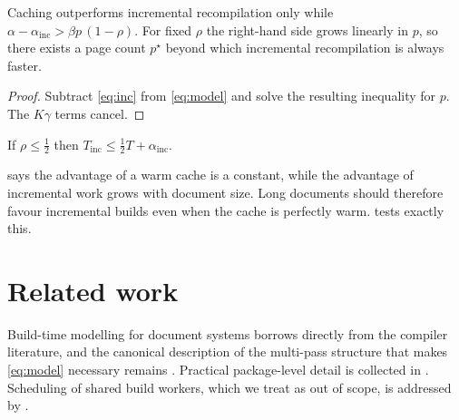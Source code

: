 \begin{theorem}[Crossover]
\label{thm:crossover}
Caching outperforms incremental recompilation only while
$\alpha - \alpha_{\mathrm{inc}} > \beta p\,(1-\rho)$. For fixed $\rho$
the right-hand side grows linearly in $p$, so there exists a page count
$p^{\star}$ beyond which incremental recompilation is always faster.
\end{theorem}

\begin{proof}
Subtract \cref{eq:inc} from \cref{eq:model} and solve the resulting
inequality for $p$. The $K\gamma$ terms cancel.
\end{proof}

\begin{lemma}
\label{lem:bound}
If $\rho \le \tfrac{1}{2}$ then $T_{\mathrm{inc}} \le \tfrac{1}{2}T + \alpha_{\mathrm{inc}}$.
\end{lemma}

\begin{keybox}
 says the advantage of a warm cache is a constant,
while the advantage of incremental work grows with document size. Long
documents should therefore favour incremental builds even when the cache
is perfectly warm.  tests exactly this.
\end{keybox}

\section{Related work}

Build-time modelling for document systems borrows directly from the
compiler literature, and the canonical description of the multi-pass
structure that makes \cref{eq:model} necessary remains
\autocite{knuth1984texbook,lamport1994latex}. Practical package-level
detail is collected in \autocite{mittelbach2023companion}. Scheduling of
shared build workers, which we treat as out of scope, is addressed by
\textcite{example2026conference}.

